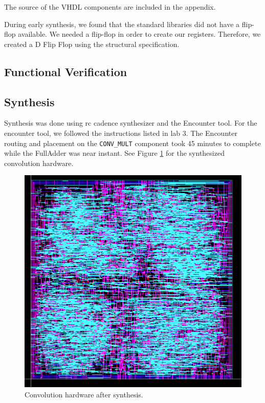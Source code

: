 The source of the VHDL components are included in the appendix.  

During early synthesis, we found that the standard libraries did not have a flip-flop available.  We needed a flip-flop in order to create our registers.  Therefore, we created a D Flip Flop using the structural specification.


\subsection{Functional Verification}



\subsection{Synthesis}

Synthesis was done using rc cadence synthesizer and the Encounter tool.  For the encounter tool, we followed the instructions listed in lab 3.  The Encounter routing and placement on the \verb=CONV_MULT= component took 45 minutes to complete while the FullAdder was near instant.  See Figure \ref{fig:convmult} for the synthesized convolution hardware.

\begin{figure}[htbp]
\centering
\includegraphics[width=6.5in]{images/CONV_MULT}
\caption{Convolution hardware after synthesis.}
\label{fig:convmult}
\end{figure}


